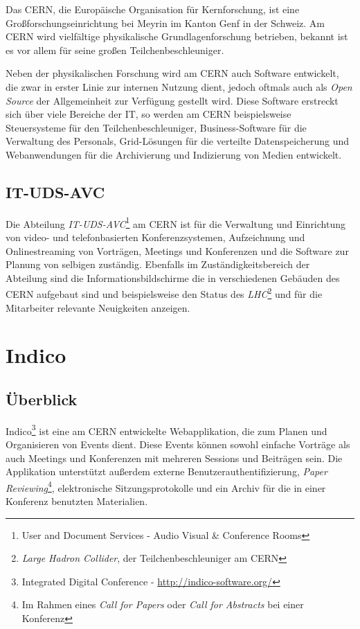 Das CERN, die Europäische Organisation für Kernforschung, ist eine Großforschungseinrichtung bei
Meyrin im Kanton Genf in der Schweiz. Am CERN wird vielfältige physikalische Grundlagenforschung
betrieben, bekannt ist es vor allem für seine großen Teilchenbeschleuniger. \citep{wiki:cern}

Neben der physikalischen Forschung wird am CERN auch Software entwickelt, die zwar in erster Linie
zur internen Nutzung dient, jedoch oftmals auch als \emph{Open Source} der Allgemeinheit zur Verfügung
gestellt wird. Diese Software erstreckt sich über viele Bereiche der IT, so werden am CERN
beispielsweise Steuersysteme für den Teilchenbeschleuniger, Business-Software für die Verwaltung des
Personals, Grid-Lösungen für die verteilte Datenspeicherung und Webanwendungen für die Archivierung
und Indizierung von Medien entwickelt.

\subsection{IT-UDS-AVC}

Die Abteilung \emph{IT-UDS-AVC}\footnote{User and Document Services - Audio Visual \& Conference
Rooms} am CERN ist für die Verwaltung und Einrichtung von video- und telefonbasierten
Konferenzsystemen, Aufzeichnung und Onlinestreaming von Vorträgen, Meetings und Konferenzen und die
Software zur Planung von selbigen zuständig. Ebenfalls im Zuständigkeitsbereich der Abteilung sind
die Informationsbildschirme die in verschiedenen Gebäuden des CERN aufgebaut sind und beispielsweise
den Status des \emph{LHC}\footnote{\emph{Large Hadron Collider}, der Teilchenbeschleuniger am CERN} und
für die Mitarbeiter relevante Neuigkeiten anzeigen.


\section{Indico}

\subsection{Überblick}
Indico\footnote{Integrated Digital Conference - \href{http://indico-software.org/}{http://indico-software.org/}}
ist eine am CERN entwickelte Webapplikation, die zum Planen und Organisieren von Events dient. Diese
Events können sowohl einfache Vorträge als auch Meetings und Konferenzen mit mehreren Sessions und
Beiträgen sein. Die Applikation unterstützt außerdem externe Benutzerauthentifizierung, \emph{Paper
Reviewing}\footnote{Im Rahmen eines \emph{Call for Papers} oder \emph{Call for Abstracts} bei einer
Konferenz}, elektronische Sitzungsprotokolle und ein Archiv für die in einer Konferenz benutzten
Materialien. \citep{indico}

